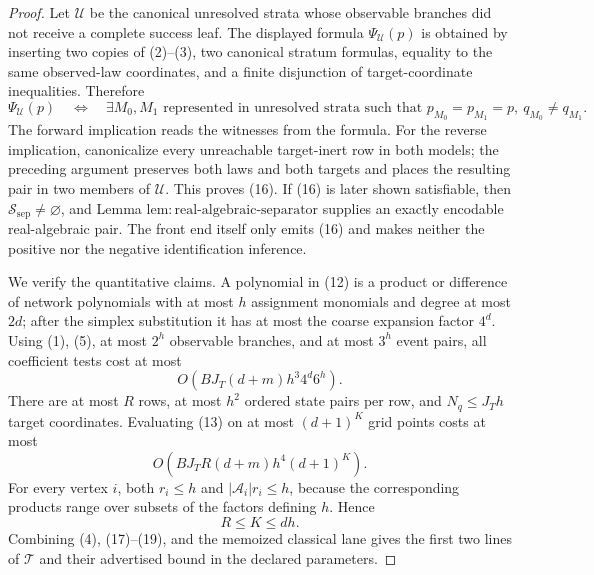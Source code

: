 \documentclass{article}
\begin{document}
\begin{proof}
Let \(\mathcal U\) be the canonical unresolved strata whose observable branches did not receive a complete success leaf. The displayed formula \(\Psi_{\mathcal U}(p)\) is obtained by inserting two copies of (2)--(3), two canonical stratum formulas, equality to the same observed-law coordinates, and a finite disjunction of target-coordinate inequalities. Therefore
\[
 \Psi_{\mathcal U}(p)
 \quad\Longleftrightarrow\quad
 \exists M_0,M_1\text{ represented in unresolved strata such that }
 p_{M_0}=p_{M_1}=p,
 \ q_{M_0}\ne q_{M_1}.
 \tag{16}
\]
The forward implication reads the witnesses from the formula. For the reverse implication, canonicalize every unreachable target-inert row in both models; the preceding argument preserves both laws and both targets and places the resulting pair in two members of \(\mathcal U\). This proves (16). If (16) is later shown satisfiable, then \(\mathcal S_{\mathrm{sep}}\ne\varnothing\), and Lemma \(\mathrm{lem:real\text{-}algebraic\text{-}separator}\) supplies an exactly encodable real-algebraic pair. The front end itself only emits (16) and makes neither the positive nor the negative identification inference.

We verify the quantitative claims. A polynomial in (12) is a product or difference of network polynomials with at most \(h\) assignment monomials and degree at most \(2d\); after the simplex substitution it has at most the coarse expansion factor \(4^d\). Using (1), (5), at most \(2^h\) observable branches, and at most \(3^h\) event pairs, all coefficient tests cost at most
\[
 O\!\left(BJ_T(d+m)h^3 4^d6^h\right).
 \tag{17}
\]
There are at most \(R\) rows, at most \(h^2\) ordered state pairs per row, and \(N_q\le J_Th\) target coordinates. Evaluating (13) on at most \((d+1)^K\) grid points costs at most
\[
 O\!\left(BJ_TR(d+m)h^4(d+1)^K\right).
 \tag{18}
\]
For every vertex \(i\), both \(r_i\le h\) and \(|\mathcal A_i|r_i\le h\), because the corresponding products range over subsets of the factors defining \(h\). Hence
\[
 R\le K\le dh.
 \tag{19}
\]
Combining (4), (17)--(19), and the memoized classical lane gives the first two lines of \(\mathcal T\) and their advertised bound in the declared parameters.


\end{proof}
\end{document}
